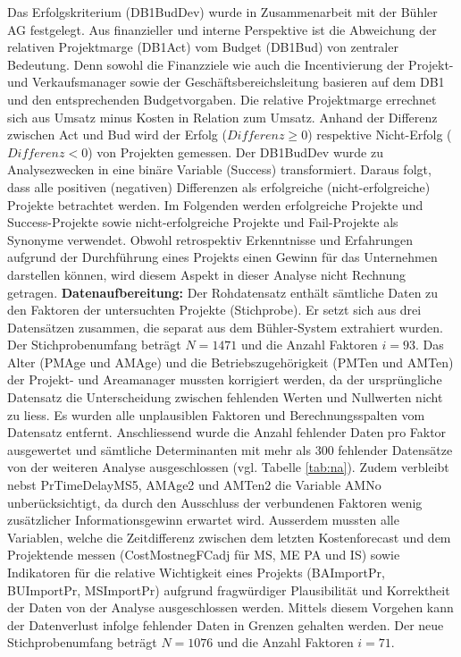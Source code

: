 \newline Das Erfolgskriterium (DB1BudDev) wurde in Zusammenarbeit mit der Bühler AG festgelegt. Aus finanzieller und interne Perspektive ist die Abweichung der relativen Projektmarge (DB1Act) vom Budget (DB1Bud) von zentraler Bedeutung. Denn sowohl die Finanzziele wie auch die Incentivierung der Projekt- und Verkaufsmanager sowie der Geschäftsbereichsleitung basieren auf dem DB1 und den entsprechenden Budgetvorgaben. Die relative Projektmarge errechnet sich aus Umsatz minus Kosten in Relation zum Umsatz. Anhand der Differenz zwischen Act und Bud wird der Erfolg ($Differenz \geq 0$) respektive Nicht-Erfolg ($Differenz < 0$) von Projekten gemessen. Der DB1BudDev wurde zu Analysezwecken in eine binäre Variable (Success) transformiert. Daraus folgt, dass alle positiven (negativen) Differenzen als erfolgreiche (nicht-erfolgreiche) Projekte betrachtet werden. Im Folgenden werden erfolgreiche Projekte und Success-Projekte sowie nicht-erfolgreiche Projekte und Fail-Projekte als Synonyme verwendet. Obwohl retrospektiv Erkenntnisse und Erfahrungen aufgrund der Durchführung eines Projekts einen Gewinn für das Unternehmen darstellen können, wird diesem Aspekt in dieser Analyse nicht Rechnung getragen.
\newline\newline\textbf{Datenaufbereitung:} Der Rohdatensatz enthält sämtliche Daten zu den Faktoren der untersuchten Projekte (Stichprobe). Er setzt sich aus drei Datensätzen zusammen, die separat aus dem Bühler-System extrahiert wurden. Der Stichprobenumfang beträgt $N = 1471$ und die Anzahl Faktoren $i = 93$. Das Alter (PMAge und AMAge) und die Betriebszugehörigkeit (PMTen und AMTen) der Projekt- und Areamanager mussten korrigiert werden, da der ursprüngliche Datensatz die Unterscheidung zwischen fehlenden Werten und Nullwerten nicht zu liess.
\newline
Es wurden alle unplausiblen Faktoren und Berechnungsspalten vom Datensatz entfernt. Anschliessend wurde die Anzahl fehlender Daten pro Faktor ausgewertet und sämtliche Determinanten mit mehr als 300 fehlender Datensätze von der weiteren Analyse ausgeschlossen (vgl. Tabelle \ref{tab:na}). Zudem verbleibt nebst PrTimeDelayMS5, AMAge2 und AMTen2 die Variable AMNo unberücksichtigt, da durch den Ausschluss der verbundenen Faktoren wenig zusätzlicher Informationsgewinn erwartet wird. Ausserdem mussten alle Variablen, welche die Zeitdifferenz zwischen dem letzten Kostenforecast und dem Projektende messen (CostMostnegFCadj für MS, ME PA und IS) sowie Indikatoren für die relative Wichtigkeit eines Projekts (BAImportPr, BUImportPr, MSImportPr) aufgrund fragwürdiger Plausibilität und Korrektheit der Daten von der Analyse ausgeschlossen werden. Mittels diesem Vorgehen kann der Datenverlust infolge fehlender Daten in Grenzen gehalten werden. Der neue Stichprobenumfang beträgt $N = 1076$ und die Anzahl Faktoren $i = 71$.
